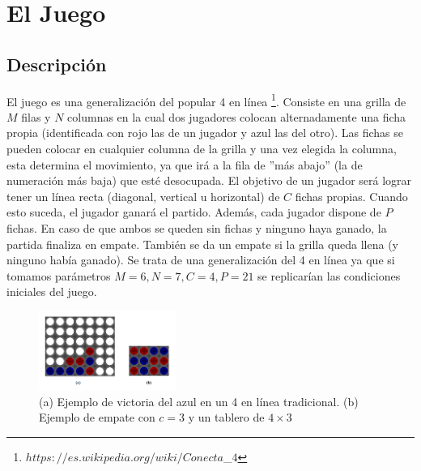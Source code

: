 \documentclass[A4paper,oneside,fleqn,11pt]{article}
\theoremstyle{definition}
\begin{document}
 



\tableofcontents
\clearpage







\section{El Juego}
\subsection{Descripción}
El juego es una generalización del popular 4 en línea \footnote{$https://es.wikipedia.org/wiki/Conecta$\_$4$}. Consiste en una grilla de $M$ filas y $N$ columnas en la cual dos jugadores colocan alternadamente una ficha propia (identificada con rojo las de un jugador y azul las del otro). Las fichas se pueden colocar en cualquier columna de la grilla y una vez elegida la columna, esta determina el movimiento, ya que irá a la fila de ''más abajo'' (la de numeración más baja) que esté desocupada. El objetivo de un jugador será lograr tener un línea recta (diagonal, vertical u horizontal) de $C$ fichas propias. Cuando esto suceda, el jugador ganará el partido. Además, cada jugador dispone de $P$ fichas. En caso de que ambos se queden sin fichas y ninguno haya ganado, la partida finaliza en empate. También se da un empate si la grilla queda llena (y ninguno había ganado). Se trata de una generalización del 4 en línea ya que si tomamos parámetros $M=6, N=7, C=4, P=21$ se replicarían las condiciones iniciales del juego.


\begin{figure}
	\includegraphics[width=0.4\textwidth]{ejemplo_1.png}
	\caption{(a) Ejemplo de victoria del azul en un 4 en línea tradicional. (b) Ejemplo de empate con $c=3$ y un tablero de $4\times 3$}
\end{figure}
\end{document}
